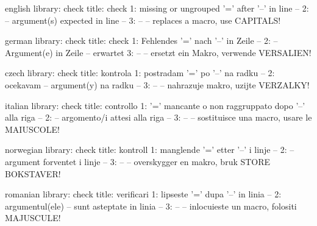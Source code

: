 \startmessages  english library: check
  title: check
      1: missing or ungrouped '=' after '--' in line --
      2: -- argument(s) expected in line --
      3: -- -- replaces a macro, use CAPITALS!
\stopmessages


\startmessages  german library: check
  title: check
      1: Fehlendes '=' nach '--' in Zeile --
      2: -- Argument(e) in Zeile -- erwartet
      3: -- -- ersetzt ein Makro, verwende VERSALIEN!
\stopmessages

\startmessages  czech library: check
  title: kontrola
      1: postradam '=' po '--' na radku --
      2: ocekavam -- argument(y) na radku --
      3: -- -- nahrazuje makro, uzijte VERZALKY!
\stopmessages

\startmessages  italian library: check
  title: controllo
      1: '=' mancante o non raggruppato dopo '--' alla riga --
      2: -- argomento/i attesi alla riga --
      3: -- -- sostituisce una macro, usare le MAIUSCOLE!
\stopmessages

\startmessages  norwegian library: check
  title: kontroll
      1: manglende '=' etter '--' i linje --
      2: -- argument forventet i linje --
      3: -- -- overskygger en makro, bruk STORE BOKSTAVER!
\stopmessages

\startmessages  romanian library: check
  title: verificari
      1: lipseste '=' dupa '--' in linia --
      2: argumentul(ele) -- sunt asteptate in linia  --
      3: -- -- inlocuieste un macro, folositi MAJUSCULE!
\stopmessages

\fi



\protect

\endinput
